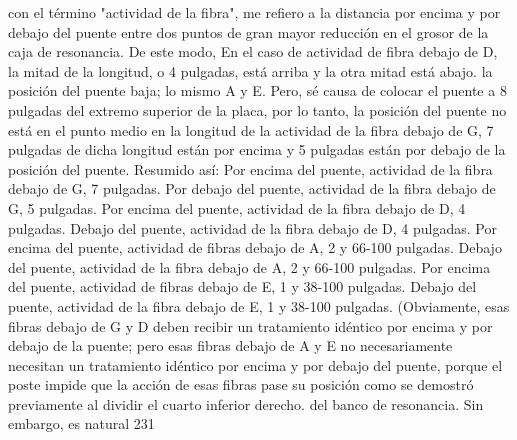 con el término "actividad de la fibra", me refiero a la distancia por encima y por debajo del puente entre dos puntos de gran
mayor reducción en el grosor de la caja de resonancia.	De este modo,
En el caso de actividad de fibra debajo de D, la mitad de la longitud, o 4 pulgadas, está arriba y la otra mitad está abajo.	
la posición del puente baja; lo mismo A y E.	Pero, sé
causa de colocar el puente a 8 pulgadas del extremo superior de la placa, por lo tanto, la posición del puente no está en el punto medio en la longitud de la actividad de la fibra debajo de G, 7 pulgadas de dicha longitud están por encima y 5 pulgadas están por debajo de la posición del puente.
Resumido así:
Por encima del puente, actividad de la fibra debajo de G, 7 pulgadas. Por debajo del puente, actividad de la fibra debajo de G, 5 pulgadas. Por encima del puente, actividad de la fibra debajo de D, 4 pulgadas.
Debajo del puente, actividad de la fibra debajo de D, 4 pulgadas.
Por encima del puente, actividad de fibras debajo de A, 2 y 66-100 pulgadas.
Debajo del puente, actividad de la fibra debajo de A, 2 y 66-100 pulgadas.
Por encima del puente, actividad de fibras debajo de E, 1 y 38-100 pulgadas.
Debajo del puente, actividad de la fibra debajo de E, 1 y 38-100 pulgadas.
(Obviamente, esas fibras debajo de G y D deben recibir un tratamiento idéntico por encima y por debajo de la
puente; pero esas fibras debajo de A y E no necesariamente necesitan un tratamiento idéntico por encima y por debajo del puente, porque el poste impide que la acción de esas fibras pase su posición como se demostró previamente al dividir el cuarto inferior derecho.
del banco de resonancia.	Sin embargo, es natural 231

